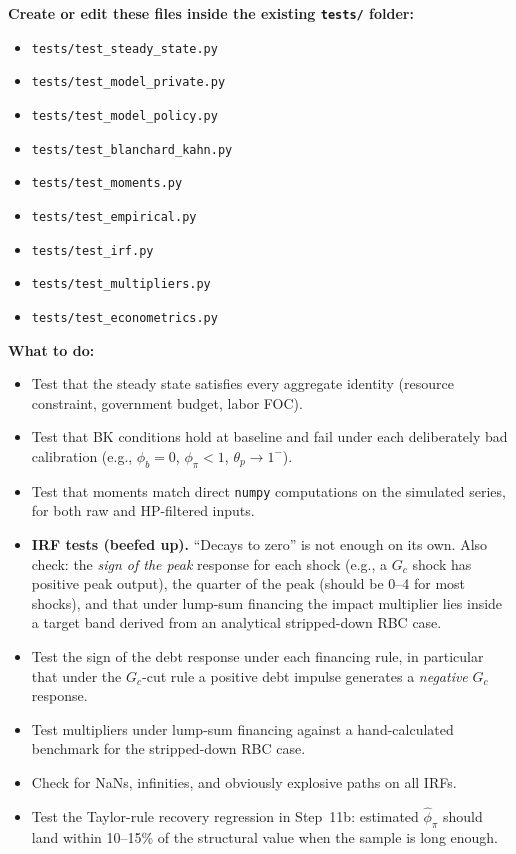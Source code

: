 \documentclass[11pt]{article}
\begin{document}
\textbf{Create or edit these files inside the existing \texttt{tests/} folder:}
\begin{itemize}
    \item \texttt{tests/test\_steady\_state.py}
    \item \texttt{tests/test\_model\_private.py}
    \item \texttt{tests/test\_model\_policy.py}
    \item \texttt{tests/test\_blanchard\_kahn.py}
    \item \texttt{tests/test\_moments.py}
    \item \texttt{tests/test\_empirical.py}
    \item \texttt{tests/test\_irf.py}
    \item \texttt{tests/test\_multipliers.py}
    \item \texttt{tests/test\_econometrics.py}
\end{itemize}

\textbf{What to do:}
\begin{itemize}
    \item Test that the steady state satisfies every aggregate identity (resource constraint, government budget, labor FOC).
    \item Test that BK conditions hold at baseline and fail under each deliberately bad calibration (e.g., $\phi_b = 0$, $\phi_\pi < 1$, $\theta_p \to 1^-$).
    \item Test that moments match direct \texttt{numpy} computations on the simulated series, for both raw and HP-filtered inputs.
    \item \textbf{IRF tests (beefed up).} ``Decays to zero'' is not enough on its own. Also check: the \emph{sign of the peak} response for each shock (e.g., a $G_c$ shock has positive peak output), the quarter of the peak (should be 0--4 for most shocks), and that under lump-sum financing the impact multiplier lies inside a target band derived from an analytical stripped-down RBC case.
    \item Test the sign of the debt response under each financing rule, in particular that under the $G_c$-cut rule a positive debt impulse generates a \emph{negative} $G_c$ response.
    \item Test multipliers under lump-sum financing against a hand-calculated benchmark for the stripped-down RBC case.
    \item Check for NaNs, infinities, and obviously explosive paths on all IRFs.
    \item Test the Taylor-rule recovery regression in Step~11b: estimated $\hat{\phi}_\pi$ should land within 10--15\% of the structural value when the sample is long enough.
\end{itemize}
\end{document}
